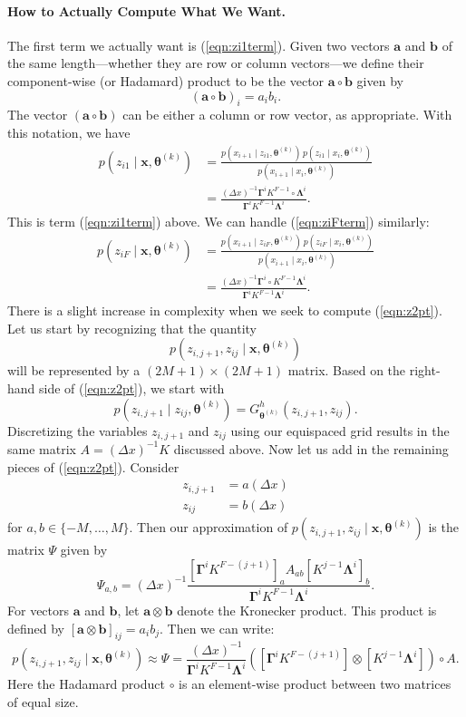 \documentclass[12pt]{article}
\newcommand{\bx}{\ensuremath{\mathbf{x}}}
\newcommand{\btheta}{\ensuremath{\boldsymbol{\theta}}}
\newcommand{\bLambda}{\ensuremath{\boldsymbol{\Lambda}}}
\newcommand{\bGamma}{\ensuremath{\boldsymbol{\Gamma}}}
\begin{document}
\paragraph{How to Actually Compute What We Want.}
The first term we actually want is (\ref{eqn:zi1term}).  
Given two vectors $\mathbf{a}$ and $\mathbf{b}$ of the same length---whether they are row or column vectors---we define their component-wise (or Hadamard) product to be the vector $\mathbf{a} \circ \mathbf{b}$ given by
$$
(\mathbf{a} \circ \mathbf{b})_i = a_i b_i.
$$
The vector $(\mathbf{a} \circ \mathbf{b})$ can be either a column or row vector, as appropriate.  With this notation, we have
\begin{align*}
p(z_{i1}\mid \bx, \btheta^{(k)}) &= \frac{p(x_{i+1} \mid z_{i1}, \btheta^{(k)}) \, p(z_{i1} \mid x_i, \btheta^{(k)})}{p(x_{i+1} \mid x_{i}, \btheta^{(k)})} \\
 &= \frac{ (\Delta x)^{-1} \bGamma^i K^{F-1} \circ \bLambda^i } { \bGamma^i K^{F-1} \bLambda^i }.
\end{align*}
This is term (\ref{eqn:zi1term}) above.  We can handle (\ref{eqn:ziFterm}) similarly:
\begin{align*}
p(z_{iF} \mid \bx, \btheta^{(k)}) &= \frac{p(x_{i+1} \mid z_{iF}, \btheta^{(k)}) \, p(z_{iF} \mid x_{i}, \btheta^{(k)})}{p(x_{i+1} \mid x_{i}, \btheta^{(k)})} \\
 &= \frac{ (\Delta x)^{-1} \bGamma^i \circ K^{F-1} \bLambda^i }{ \bGamma^i K^{F-1} \bLambda^i }.
\end{align*}
There is a slight increase in complexity when we seek to compute (\ref{eqn:z2pt}).  Let us start by recognizing that the quantity
$$
p(z_{i,j+1}, z_{ij} \mid \bx, \btheta^{(k)})
$$
will be represented by a $(2M+1) \times (2M+1)$ matrix.  Based on the right-hand side of (\ref{eqn:z2pt}), we start with
$$
p(z_{i,j+1} \mid z_{ij}, \btheta^{(k)}) = G^h_{\btheta^{(k)}}(z_{i,j+1}, z_{ij}).
$$
Discretizing the variables $z_{i,j+1}$ and $z_{ij}$ using our equispaced grid results in the same matrix $A = (\Delta x)^{-1} K$ discussed above.  Now let us add in the remaining pieces of (\ref{eqn:z2pt}).  Consider
\begin{align*}
z_{i,j+1} &= a (\Delta x) \\
z_{ij} &= b (\Delta x)
\end{align*}
for $a, b \in \{-M, \ldots, M\}$.  Then our approximation of $p(z_{i,j+1}, z_{ij} \mid \bx, \btheta^{(k)})$ is the matrix $\Psi$ given by
\begin{equation}
\label{eqn:Psidef}
\Psi_{a,b} = (\Delta x)^{-1} \frac{ \left[ \bGamma^i K^{F-(j+1)} \right]_a A_{ab} \left[ K^{j-1} \bLambda^i \right]_b }{ \bGamma^i K^{F-1} \bLambda^i }.
\end{equation}
For vectors $\mathbf{a}$ and $\mathbf{b}$, let $\mathbf{a} \otimes \mathbf{b}$ denote the Kronecker product.  This product is defined by $[\mathbf{a} \otimes \mathbf{b}]_{ij} = a_i b_j$.  Then we can write:
$$
p(z_{i,j+1}, z_{ij} \mid \bx, \btheta^{(k)}) \approx \Psi = \frac{ (\Delta x)^{-1} } { \bGamma^i K^{F-1} \bLambda^i } \left( \left[ \bGamma^i K^{F-(j+1)} \right] \otimes \left[ K^{j-1} \bLambda^i \right] \right) \circ A.
$$
Here the Hadamard product $\circ$ is an element-wise product between two matrices of equal size.
\end{document}

